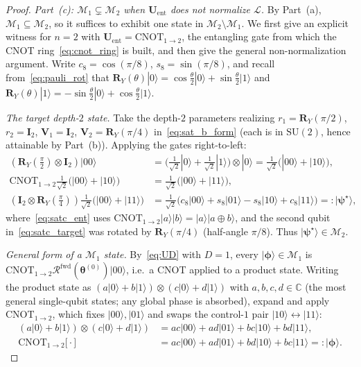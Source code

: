 \documentclass[11pt]{article}
\newcommand{\SU}{\mathrm{SU}}
\newcommand{\CNOT}{\mathrm{CNOT}}
\newcommand{\cM}{\mathcal{M}}
\newcommand{\bbC}{\mathbb{C}}
\theoremstyle{plain}
\theoremstyle{plain}
\begin{document}
\begin{proof}
\textit{Part~(c): $\cM_1\subsetneq\cM_2$ when $\mathbf{U}_{\mathrm{ent}}$ does
not normalize $\mathcal{L}$.}
By Part~(a), $\cM_1\subseteq\cM_2$, so it suffices to exhibit one state
in $\cM_2\setminus\cM_1$. We first give an explicit witness for $n=2$
with $\mathbf{U}_{\mathrm{ent}}=\CNOT_{1\to2}$, the entangling gate from which
the CNOT ring~\eqref{eq:cnot_ring} is built, and then give the general
non-normalization argument. Write
$c_8=\cos(\pi/8)$, $s_8=\sin(\pi/8)$, and recall from~\eqref{eq:pauli_rot}
that $\mathbf{R}_Y(\theta)|0\rangle=\cos\tfrac\theta2|0\rangle
+\sin\tfrac\theta2|1\rangle$ and
$\mathbf{R}_Y(\theta)|1\rangle=-\sin\tfrac\theta2|0\rangle
+\cos\tfrac\theta2|1\rangle$.

\emph{The target depth-$2$ state.} Take the depth-$2$ parameters
realizing $r_1=\mathbf{R}_Y(\pi/2)$, $r_2=\mathbf{I}_2$, $\mathbf{V}_1=\mathbf{I}_2$,
$\mathbf{V}_2=\mathbf{R}_Y(\pi/4)$ in~\eqref{eq:sat_b_form} (each is in $\SU(2)$, hence
attainable by Part~(b)). Applying the gates right-to-left:
\begin{align}
  (\mathbf{R}_Y(\tfrac\pi2)\otimes\mathbf{I}_2)|00\rangle
  &= \bigl(\tfrac{1}{\sqrt2}|0\rangle+\tfrac{1}{\sqrt2}|1\rangle\bigr)
     \otimes|0\rangle
   = \tfrac{1}{\sqrt2}\bigl(|00\rangle+|10\rangle\bigr),
     \label{eq:satc_pre}\\
  \CNOT_{1\to2} \tfrac{1}{\sqrt2}\bigl(|00\rangle+|10\rangle\bigr)
  &= \tfrac{1}{\sqrt2}\bigl(|00\rangle+|11\rangle\bigr),
     \label{eq:satc_ent}\\
  (\mathbf{I}_2\otimes\mathbf{R}_Y(\tfrac\pi4)) 
     \tfrac{1}{\sqrt2}\bigl(|00\rangle+|11\rangle\bigr)
  &= \tfrac{1}{\sqrt2}\bigl(c_8|00\rangle+s_8|01\rangle
     -s_8|10\rangle+c_8|11\rangle\bigr)
   =: |\boldsymbol{\psi}^\star\rangle,
     \label{eq:satc_target}
\end{align}
where~\eqref{eq:satc_ent} uses
$\CNOT_{1\to2}|a\rangle|b\rangle=|a\rangle|a\oplus b\rangle$, and the
second qubit in~\eqref{eq:satc_target} was rotated by
$\mathbf{R}_Y(\pi/4)$ (half-angle $\pi/8$). Thus
$|\boldsymbol{\psi}^\star\rangle\in\cM_2$.

\emph{General form of a $\cM_1$ state.} By~\eqref{eq:UD} with $D=1$,
every $|\boldsymbol{\phi}\rangle\in\cM_1$ is
$\CNOT_{1\to2} \mathcal{R}^{\mathrm{fwd}}(\bm\theta^{(0)})|00\rangle$,
i.e.\ a CNOT applied to a product state. Writing the product state as
$(a|0\rangle+b|1\rangle)\otimes(c|0\rangle+d|1\rangle)$ with
$a,b,c,d\in\bbC$ (the most general single-qubit states; any global
phase is absorbed), expand and apply $\CNOT_{1\to2}$, which fixes
$|00\rangle,|01\rangle$ and swaps the control-$1$ pair
$|10\rangle\leftrightarrow|11\rangle$:
\begin{align}
  (a|0\rangle{+}b|1\rangle)\otimes(c|0\rangle{+}d|1\rangle)
  &= ac |00\rangle+ad |01\rangle+bc |10\rangle+bd |11\rangle,
     \label{eq:satc_prod}\\
  \CNOT_{1\to2}\bigl[ \cdot \bigr]
  &= ac |00\rangle+ad |01\rangle+bd |10\rangle+bc |11\rangle
   =: |\boldsymbol{\phi}\rangle.
     \label{eq:satc_phi}
\end{align}


\end{proof}
\end{document}
